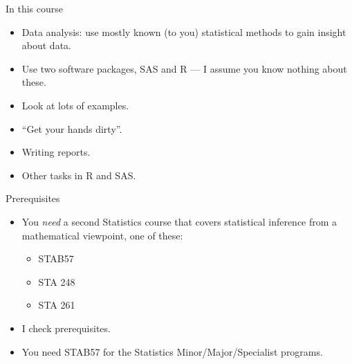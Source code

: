 \documentclass[ignorenonframetext,]{beamer}
\date{}
\providecommand{\tightlist}{%
  \setlength{\itemsep}{0pt}\setlength{\parskip}{0pt}}
\begin{document}
\begin{frame}{In this course}
\protect\hypertarget{in-this-course}{}

\begin{itemize}
\tightlist
\item
  Data analysis: use mostly known (to you) statistical methods to gain
  insight about data.
\item
  Use two software packages, SAS and R --- I assume you know nothing
  about these.
\item
  Look at lots of examples.
\item
  ``Get your hands dirty''.
\item
  Writing reports.
\item
  Other tasks in R and SAS.
\end{itemize}

\end{frame}

\begin{frame}{Prerequisites}
\protect\hypertarget{prerequisites}{}

\begin{itemize}
\tightlist
\item
  You \emph{need} a second Statistics course that covers statistical
  inference from a mathematical viewpoint, one of these:

  \begin{itemize}
  \tightlist
  \item
    STAB57
  \item
    STA 248
  \item
    STA 261
  \end{itemize}
\item
  I check prerequisites.
\item
  You need STAB57 for the Statistics Minor/Major/Specialist programs.
\end{itemize}

\end{frame}
\end{document}
